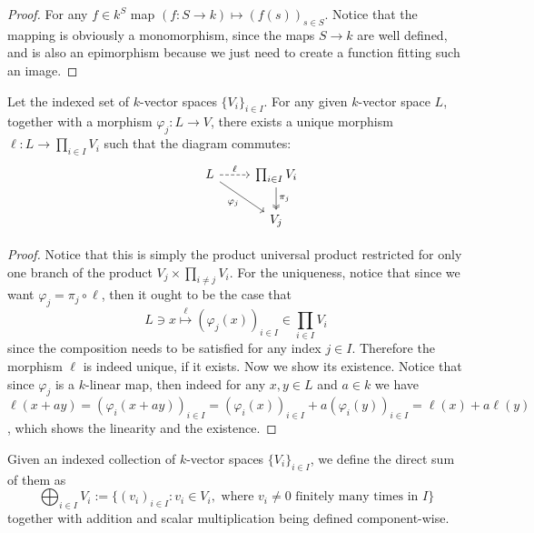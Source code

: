 \begin{proof}
   For any \(f \in k^S\) map \((f : S \to k) \mapsto (f(s))_{s \in S}\). Notice
   that the mapping is obviously a monomorphism, since the maps \(S \to k\) are
   well defined, and is also an epimorphism because we just need to create
   a function fitting such an image.
\end{proof}

\begin{proposition}
   Let the indexed set of \(k\)-vector spaces \(\{V_i\}_{i \in I}\). For any
   given \(k\)-vector space \(L\), together with a morphism \(\varphi_j : L \to
   V\), there exists a unique morphism \(\ell : L \to \prod_{i \in I} V_i\) such
   that the diagram commutes:
   \[
      \begin{tikzcd}
         &L
         \ar[r, dashed, "\ell"]
         \ar[dr, swap, "\varphi_j"]
           &\prod_{i \in I} V_i
           \ar[d, "\pi_j", two heads] \\
         &
           &V_j
      \end{tikzcd}
   \]
\end{proposition}

\begin{proof}
   Notice that this is simply the product universal product restricted for only
   one branch of the product \(V_j \times \prod_{i \neq j} V_i\). For the
   uniqueness, notice that since we want \(\varphi_j = \pi_j \circ \ell\), then
   it ought to be the case that
   \[
      L \ni x \overset{\ell}\longmapsto (\varphi_j(x))_{i \in I} \in \prod_{i
      \in I} V_i
   \]
   since the composition needs to be satisfied for any index \(j \in I\).
   Therefore the morphism \(\ell\) is indeed unique, if it exists. Now we show
   its existence. Notice that since \(\varphi_j\) is a \(k\)-linear map, then
   indeed for any \(x, y \in L\) and \(a \in k\) we have \(\ell(x + ay) =
   (\varphi_i(x + ay))_{i \in I} = (\varphi_i(x))_{i \in I} + a
   (\varphi_i(y))_{i \in I} = \ell(x) + a \ell(y)\), which shows the linearity
   and the existence.
\end{proof}

\begin{definition}
   Given an indexed collection of \(k\)-vector spaces \(\{V_i\}_{i \in I}\), we
   define the direct sum of them as
   \[
      \bigoplus _{i \in I} V_i := \{(v_i)_{i \in I} : v_i \in V_i, \text{ where
      } v_i \neq 0 \text{ finitely many times in } I\}
   \]
   together with addition and scalar multiplication being defined component-wise.
\end{definition}

